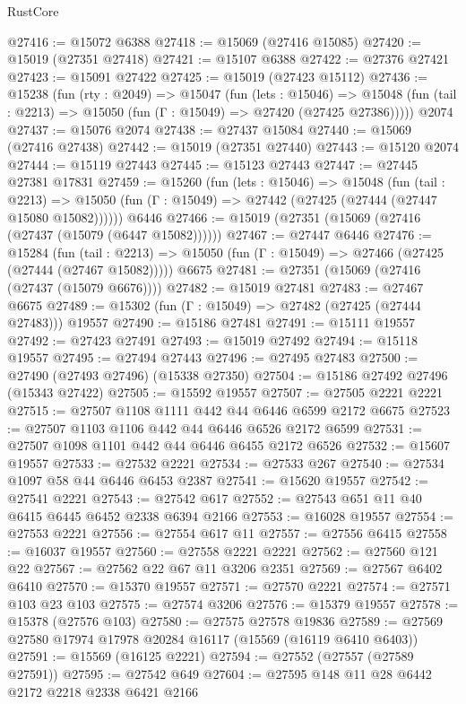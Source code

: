 \begin{lexlean}{RustCore}
\begin{coremodule}
@27416 := @15072 @6388
@27418 := @15069 (@27416 @15085)
@27420 := @15019 (@27351 @27418)
@27421 := @15107 @6388
@27422 := @27376 @27421
@27423 := @15091 @27422
@27425 := @15019 (@27423 @15112)
@27436 := @15238
    (fun (rty : @2049) =>
    @15047
      (fun (lets : @15046) =>
      @15048 (fun (tail : @2213) => @15050 (fun (Γ : @15049) => @27420 (@27425 @27386)))))
    @2074
@27437 := @15076 @2074
@27438 := @27437 @15084
@27440 := @15069 (@27416 @27438)
@27442 := @15019 (@27351 @27440)
@27443 := @15120 @2074
@27444 := @15119 @27443
@27445 := @15123 @27443
@27447 := @27445 @27381 @17831
@27459 := @15260
    (fun (lets : @15046) =>
    @15048
      (fun (tail : @2213) =>
      @15050 (fun (Γ : @15049) => @27442 (@27425 (@27444 (@27447 @15080 @15082))))))
    @6446
@27466 := @15019 (@27351 (@15069 (@27416 (@27437 (@15079 (@6447 @15082))))))
@27467 := @27447 @6446
@27476 := @15284
    (fun (tail : @2213) => @15050 (fun (Γ : @15049) => @27466 (@27425 (@27444 (@27467 @15082)))))
    @6675
@27481 := @27351 (@15069 (@27416 (@27437 (@15079 @6676))))
@27482 := @15019 @27481
@27483 := @27467 @6675
@27489 := @15302 (fun (Γ : @15049) => @27482 (@27425 (@27444 @27483))) @19557
@27490 := @15186 @27481
@27491 := @15111 @19557
@27492 := @27423 @27491
@27493 := @15019 @27492
@27494 := @15118 @19557
@27495 := @27494 @27443
@27496 := @27495 @27483
@27500 := @27490 (@27493 @27496) (@15338 @27350)
@27504 := @15186 @27492 @27496 (@15343 @27422)
@27505 := @15592 @19557
@27507 := @27505 @2221 @2221
@27515 := @27507 @1108 @1111 @442 @44 @6446 @6599 @2172 @6675
@27523 := @27507 @1103 @1106 @442 @44 @6446 @6526 @2172 @6599
@27531 := @27507 @1098 @1101 @442 @44 @6446 @6455 @2172 @6526
@27532 := @15607 @19557
@27533 := @27532 @2221
@27534 := @27533 @267
@27540 := @27534 @1097 @58 @44 @6446 @6453 @2387
@27541 := @15620 @19557
@27542 := @27541 @2221
@27543 := @27542 @617
@27552 := @27543 @651 @11 @40 @6415 @6445 @6452 @2338 @6394 @2166
@27553 := @16028 @19557
@27554 := @27553 @2221
@27556 := @27554 @617 @11
@27557 := @27556 @6415
@27558 := @16037 @19557
@27560 := @27558 @2221 @2221
@27562 := @27560 @121 @22
@27567 := @27562 @22 @67 @11 @3206 @2351
@27569 := @27567 @6402 @6410
@27570 := @15370 @19557
@27571 := @27570 @2221
@27574 := @27571 @103 @23 @103
@27575 := @27574 @3206
@27576 := @15379 @19557
@27578 := @15378 (@27576 @103)
@27580 := @27575 @27578 @19836
@27589 := @27569 @27580 @17974 @17978 @20284 @16117 (@15569 (@16119 @6410 @6403))
@27591 := @15569 (@16125 @2221)
@27594 := @27552 (@27557 (@27589 @27591))
@27595 := @27542 @649
@27604 := @27595 @148 @11 @28 @6442 @2172 @2218 @2338 @6421 @2166

\end{coremodule}
\end{lexlean}
